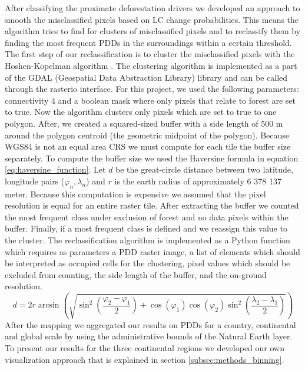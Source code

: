 			After classifying the proximate deforestation drivers we developed an approach to smooth the misclassified pixels based on \ac{LC} change probabilities. This means the algorithm tries to find for clusters of misclassified pixels and to reclassify them by finding the most frequent \acp{PDD} in the surroundings within a certain threshold. The first step of our reclassification is to cluster the misclassified pixels with the Hoshen-Kopelman algorithm \citep{Hoshen1998}. The clustering algorithm is implemented as a part of the GDAL (Geospatial Data Abstraction Library) library and can be called through the rasterio interface. For this project, we used the following parameters: connectivity 4 and a boolean mask where only pixels that relate to forest are set to true. Now the algorithm clusters only pixels which are set to true to one polygon. After, we created a squared-sized buffer with a side length of 500 m around the polygon centroid (the geometric midpoint of the polygon). Because \ac{WGS84} is not an equal area \ac{CRS} we must compute for each tile the buffer size separately. To compute the buffer size we used the Haversine formula in equation \ref{eq:haversine_function}. Let $d$ be the great-circle distance between two latitude, longitude pairs ($\varphi_n, \lambda_n$) and $r$ is the earth radius of approximately 6 378 137 meter. Because this computation is expensive we assumed that the pixel resolution is equal for an entire raster tile. After extracting the buffer we counted the most frequent class under exclusion of forest and no data pixels within the buffer. Finally, if a most frequent class is defined and we reassign this value to the cluster. The reclassification algorithm is implemented as a Python function which requires as parameters a \ac{PDD} raster image, a list of elements which should be interpreted as occupied cells for the clustering, pixel values which should be excluded from counting, the side length of the buffer, and the on-ground resolution. 
			\begin{equation}
			\label{eq:haversine_function}
				d = 2r\arcsin\left(
				\sqrt{
						\sin^2\left(\frac{\varphi_2-\varphi_1}{2}\right)+\cos\left(\varphi_1\right)\cos\left(\varphi_2\right)\sin^2\left(\frac{\lambda_2-\lambda_1}{2}\right)
				}
				\right)
			\end{equation}
			After the mapping we aggregated our results on \acp{PDD} for a country, continental and global scale by using the administrative bounds of the Natural Earth layer. To present our results for the three continental regions we developed our own visualization approach that is explained in section \ref{subsec:methods_binning}.

